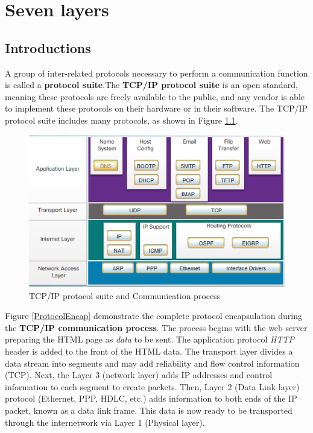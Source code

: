 \chapter{Seven layers}

\section{Introductions}

A group of inter-related protocols necessary to perform a communication function is called a \textbf{protocol suite}.The \textbf{TCP/IP protocol suite} is an open standard, meaning these protocols are freely available to the public, and any vendor is able to implement these protocols on their hardware or in their software. The TCP/IP protocol suite includes many protocols, as shown in Figure \ref{TCPIP}.

\begin{figure}[hbtp]
\caption{TCP/IP protocol suite and Communication process}\label{TCPIP}
\centering
\includegraphics[scale=0.7]{pictures/TCPIP.PNG}
\end{figure}

Figure \ref{ProtocolEncap}  demonstrate the complete protocol encapsulation during the \textbf{TCP/IP communication process}. The process begins with the web server preparing the HTML page as \emph{data} to be sent. The application protocol \emph{HTTP} header is added to the front of the HTML data. The transport layer divides a data stream into segments and may add reliability and flow control information (TCP). Next, the Layer 3 (network layer) adds IP addresses and control information to each segment to create packets. Then, Layer 2 (Data Link layer) protocol (Ethernet, PPP, HDLC, etc.) adds information to both ends of the IP packet, known as a data link frame. This data is now ready to be transported through the internetwork via Layer 1 (Physical layer).\\

